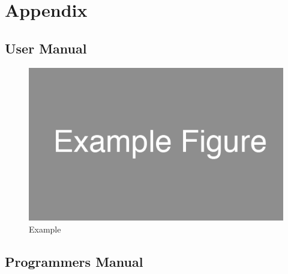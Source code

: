 \documentclass[12pt,letterpaper]{article}
\begin{document}
\clearpage\null
\section{Appendix}


\subsection{User Manual}
\clearpage\null

\begin{figure}
\centering
\includegraphics[scale=0.35]{images/example_figure.png}
\caption{Example}
\label{fig:home}
\end{figure}

\clearpage\null
\subsection{Programmers Manual}

\end{document}
